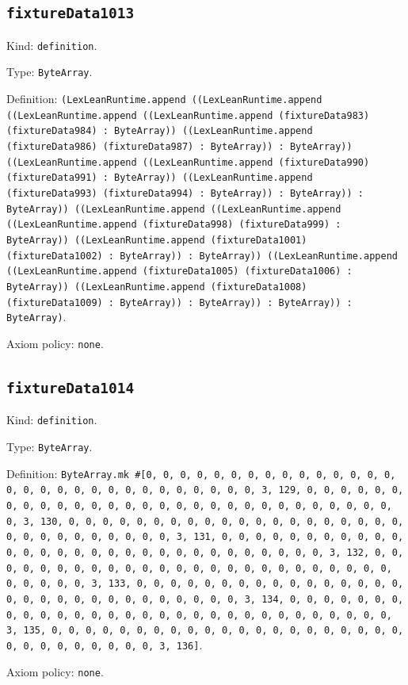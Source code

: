 \documentclass[11pt]{article}
\begin{document}
\subsection*{\texttt{fixtureData1013}}
\noindent Kind: \texttt{definition}.\par
\noindent Type: \texttt{ByteArray}.\par
\noindent Definition: \texttt{(LexLeanRuntime.append ((LexLeanRuntime.append ((LexLeanRuntime.append ((LexLeanRuntime.append (fixtureData983) (fixtureData984) : ByteArray)) ((LexLeanRuntime.append (fixtureData986) (fixtureData987) : ByteArray)) : ByteArray)) ((LexLeanRuntime.append ((LexLeanRuntime.append (fixtureData990) (fixtureData991) : ByteArray)) ((LexLeanRuntime.append (fixtureData993) (fixtureData994) : ByteArray)) : ByteArray)) : ByteArray)) ((LexLeanRuntime.append ((LexLeanRuntime.append ((LexLeanRuntime.append (fixtureData998) (fixtureData999) : ByteArray)) ((LexLeanRuntime.append (fixtureData1001) (fixtureData1002) : ByteArray)) : ByteArray)) ((LexLeanRuntime.append ((LexLeanRuntime.append (fixtureData1005) (fixtureData1006) : ByteArray)) ((LexLeanRuntime.append (fixtureData1008) (fixtureData1009) : ByteArray)) : ByteArray)) : ByteArray)) : ByteArray)}.\par
\noindent Axiom policy: \texttt{none}.\par
\subsection*{\texttt{fixtureData1014}}
\noindent Kind: \texttt{definition}.\par
\noindent Type: \texttt{ByteArray}.\par
\noindent Definition: \texttt{ByteArray.mk \#[0, 0, 0, 0, 0, 0, 0, 0, 0, 0, 0, 0, 0, 0, 0, 0, 0, 0, 0, 0, 0, 0, 0, 0, 0, 0, 0, 0, 0, 0, 3, 129, 0, 0, 0, 0, 0, 0, 0, 0, 0, 0, 0, 0, 0, 0, 0, 0, 0, 0, 0, 0, 0, 0, 0, 0, 0, 0, 0, 0, 0, 0, 3, 130, 0, 0, 0, 0, 0, 0, 0, 0, 0, 0, 0, 0, 0, 0, 0, 0, 0, 0, 0, 0, 0, 0, 0, 0, 0, 0, 0, 0, 0, 0, 3, 131, 0, 0, 0, 0, 0, 0, 0, 0, 0, 0, 0, 0, 0, 0, 0, 0, 0, 0, 0, 0, 0, 0, 0, 0, 0, 0, 0, 0, 0, 0, 3, 132, 0, 0, 0, 0, 0, 0, 0, 0, 0, 0, 0, 0, 0, 0, 0, 0, 0, 0, 0, 0, 0, 0, 0, 0, 0, 0, 0, 0, 0, 0, 3, 133, 0, 0, 0, 0, 0, 0, 0, 0, 0, 0, 0, 0, 0, 0, 0, 0, 0, 0, 0, 0, 0, 0, 0, 0, 0, 0, 0, 0, 0, 0, 3, 134, 0, 0, 0, 0, 0, 0, 0, 0, 0, 0, 0, 0, 0, 0, 0, 0, 0, 0, 0, 0, 0, 0, 0, 0, 0, 0, 0, 0, 0, 0, 3, 135, 0, 0, 0, 0, 0, 0, 0, 0, 0, 0, 0, 0, 0, 0, 0, 0, 0, 0, 0, 0, 0, 0, 0, 0, 0, 0, 0, 0, 0, 0, 3, 136]}.\par
\noindent Axiom policy: \texttt{none}.\par
\end{document}

